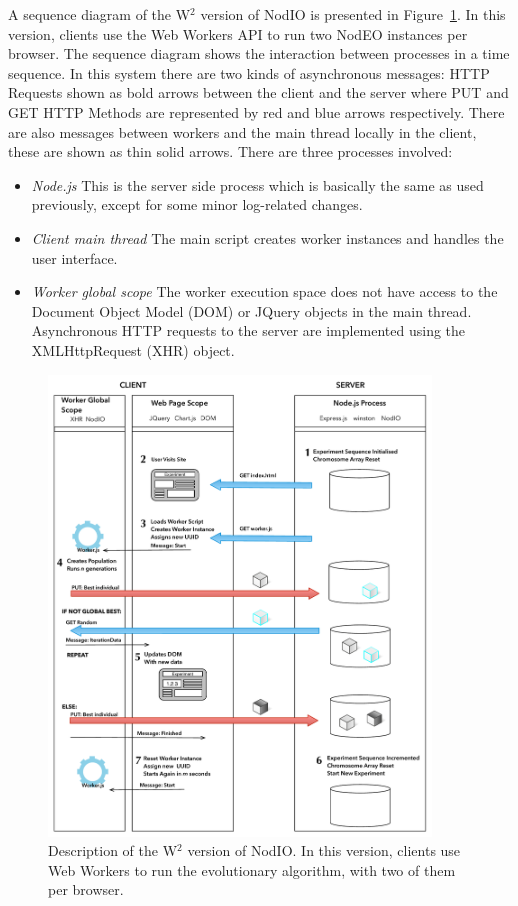 \documentclass[journal,onecolumn]{IEEEtran}
\begin{document}
A sequence diagram of the W$^2$ version of {\sf NodIO} is presented
in Figure~\ref{fig:system:w2}. In this version, clients use the Web Workers
API to run two NodEO instances per browser. The sequence diagram shows the
interaction between processes in a time sequence. In this system there are
two kinds of asynchronous messages: HTTP Requests shown as bold arrows between
the client and the server where PUT and GET HTTP Methods are represented by
red and blue arrows respectively. There are also messages between workers and
the main thread locally in the client, these are shown as thin solid arrows.
There are three processes involved:
\begin{itemize}
\item {\em Node.js} This is the server side process which is basically
  the same as used previously, except for some minor log-related
  changes. 
\item {\em Client main thread} The main script creates
worker instances and handles the user interface.
\item {\em Worker global scope} The worker execution space does not have
access to the Document Object Model (DOM) or JQuery objects in the main thread.
Asynchronous HTTP requests to the server are implemented using the
XMLHttpRequest (XHR) object.  
\end{itemize}


%
\begin{figure}[!htb]
\centering
\includegraphics[width=4in]{Algorithm.pdf}
\caption{Description of the W$^2$ version of {\sf NodIO}. In this
  version, clients use Web Workers to run the evolutionary algorithm,
  with two of them per browser.}
\label{fig:system:w2}
\end{figure}
\end{document}
